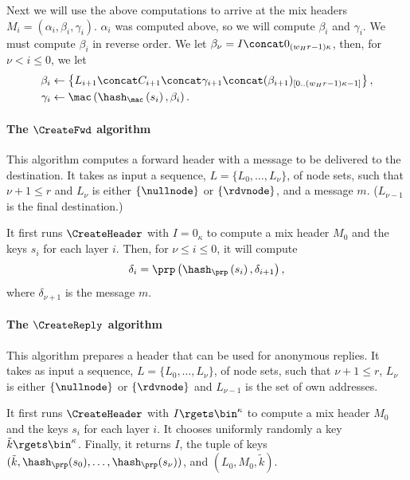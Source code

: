Next we will use the above computations to arrive at the mix headers \(M_i = 
  (\alpha_i, \beta_i, \gamma_i)\).
\(\alpha_i\) was computed above, so we will compute \(\beta_i\) and 
\(\gamma_i\).
We must compute \(\beta_i\) in reverse order. 
We let \(\beta_{\nu} = I\concat 0_{(w_H r-1)\kappa}\), then, for \(\nu < i\leq 
  0\), we let
\begin{align*}
  \beta_i &\gets \left\{L_{i+1}\concat C_{i+1}\concat \gamma_{i+1}\concat 
    (\beta_{i+1})_{[0..(w_H r-1)\kappa-1]}\right\}, \\
  \gamma_i &\gets \mac\left( \hash_\mac\left(s_i\right), \beta_i \right).
\end{align*}

\paragraph*{The \(\CreateFwd\) algorithm}

This algorithm computes a forward header with a message to be delivered to the 
destination.
It takes as input a sequence, \(L = \{L_0, \dotsc, L_\nu\}\), of node sets, 
such that \(\nu+1\leq r\) and \(L_\nu\) is either \(\{\nullnode\}\) or 
\(\{\rdvnode\}\), and a message \(m\).
(\Ie \(L_{\nu-1}\) is the final destination.)

It first runs \(\CreateHeader\) with \(I = 0_\kappa\) to compute a mix header 
\(M_0\) and the keys \(s_i\) for each layer \(i\).
Then, for \(\nu\leq i\leq 0\), it will compute
\begin{equation*}
  \delta_i = \prp\left(
    \hash_\prp\left(s_i\right),
    \delta_{i+1}\right),
\end{equation*}
where \(\delta_{\nu+1}\) is the message \(m\).

\paragraph*{The \(\CreateReply\) algorithm}

This algorithm prepares a header that can be used for anonymous replies.
It takes as input a sequence, \(L = \{L_0, \dotsc, L_\nu\}\), of node sets, 
such that \(\nu+1\leq r\), \(L_\nu\) is either \(\{\nullnode\}\) or 
\(\{\rdvnode\}\) and \(L_{\nu-1}\) is the set of own addresses.

It first runs \(\CreateHeader\) with \(I\rgets \bin^\kappa\) to compute a mix 
header \(M_0\) and the keys \(s_i\) for each layer \(i\).
It chooses uniformly randomly a key \(\tilde k\rgets \bin^\kappa\).
Finally, it returns
\(I\),
the tuple of keys \((\tilde k, \hash_\prp(s_0), \dotsc, \hash_\prp(s_\nu))\),
and \((L_0, M_0, \tilde k)\).

